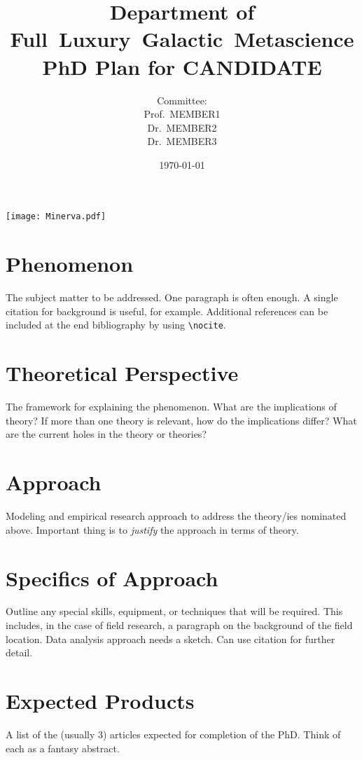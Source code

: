\documentclass[
]{book}
\title[PhD Plan for CANDIDATE]{Department of \mbox{Full Luxury Galactic Metascience}\\PhD Plan for CANDIDATE}
\author[]{Committee:\\
Prof.~MEMBER1\\
Dr.~MEMBER2\\
Dr.~MEMBER3}
\author{}
\date{\vspace{-2.5em}\today}
\begin{document}
\maketitle%

\begin{marginfigure}[-5.2cm]
\texttt{[image: Minerva.pdf]}
\end{marginfigure}

\section{Phenomenon}
The subject matter to be addressed. One paragraph is often enough. A single citation for background is useful, for example.\cite{HenrichMcElreath:2003} Additional references can be included at the end bibliography by using \verb|\nocite|. \nocite{NBGA2005}

\section{Theoretical Perspective}
The framework for explaining the phenomenon. What are the implications of theory? If more than one theory is relevant, how do the implications differ? What are the current holes in the theory or theories?

\section{Approach}
Modeling and empirical research approach to address the theory/ies nominated above. Important thing is to \emph{justify} the approach in terms of theory. 

\section{Specifics of Approach}
Outline any special skills, equipment, or techniques that will be required. This includes, in the case of field research, a paragraph on the background of the field location. Data analysis approach needs a sketch. Can use citation\cite{Merowetal2014} for further detail.

\section{Expected Products}
A list of the (usually 3) articles expected for completion of the PhD. Think of each as a fantasy abstract.
\end{document}

